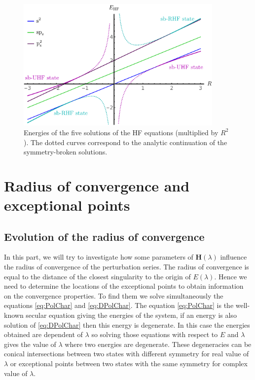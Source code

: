 \documentclass[11pt,a4paper]{article}
\newcommand{\bH}{\mathbf{H}}
\begin{document}
\begin{figure}[h!]
    \centering
    \includegraphics[width=0.9\textwidth]{EsbHF.pdf}
    \caption{\centering Energies of the five solutions of the HF equations (multiplied by $R^2$). The dotted curves correspond to the analytic continuation of the symmetry-broken solutions.}
    \label{fig:SpheriumNrj}
\end{figure}

\section{Radius of convergence and exceptional points}

\subsection{Evolution of the radius of convergence}

In this part, we will try to investigate how some parameters of $\bH(\lambda)$ influence the radius of convergence of the perturbation series. The radius of convergence is equal to the distance of the closest singularity to the origin of $E(\lambda)$. Hence we need to determine the locations of the exceptional points to obtain information on the convergence properties. To find them we solve simultaneously the equations \eqref{eq:PolChar} and \eqref{eq:DPolChar}. The equation \eqref{eq:PolChar} is the well-known secular equation giving the energies of the system, if an energy is also solution of \eqref{eq:DPolChar} then this energy is degenerate. In this case the energies obtained are dependent of $\lambda$ so solving those equations with respect to $E$ and $\lambda$ gives the value of $\lambda$ where two energies are degenerate. These degeneracies can be conical intersections between two states with different symmetry for real value of $\lambda$ or exceptional points between two states with the same symmetry for complex value of $\lambda$.
\end{document}
